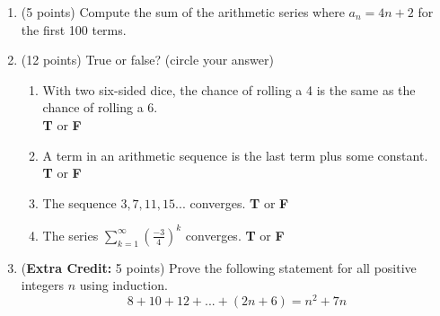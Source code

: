 \documentclass[11pt]{article}
\begin{document}
\begin{enumerate}
\newpage


\item (5 points) Compute the sum of the arithmetic series where $a_n = 4n + 2$ for the first 100 terms.

\vspace{60pt}


\item (12 points) True or false? (circle your answer)
\begin{enumerate}[itemsep=15pt, label={\alph*)}]
\item With two six-sided dice, the chance of rolling a 4 is the same as the chance of rolling a 6.\\ \null\hfill \textbf{T} or \textbf{F}
\item A term in an arithmetic sequence is the last term plus some constant.  \\ \null\hfill \textbf{T} or \textbf{F}
\item The sequence $3, 7,  11, 15...$ converges. \null\hfill \textbf{T} or \textbf{F}
\item The series $\sum_{k=1}^{\infty} (\frac{-3}{4})^k$ converges. \null\hfill \textbf{T} or \textbf{F}

\end{enumerate}

\vspace{20pt}

\item (\textbf{Extra Credit:} 5 points) Prove the following statement for all positive integers $n$ using induction. \\
$$8 + 10 + 12 + ... + (2n + 6) = n^2 + 7n$$

\end{enumerate}
\end{document}
